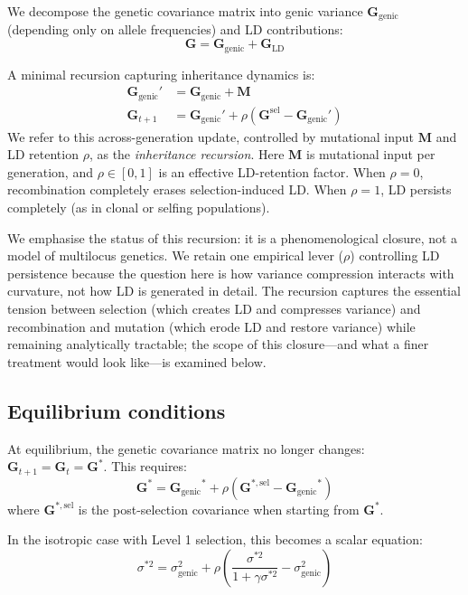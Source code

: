 \documentclass[9pt,twocolumn,twoside,lineno]{gsajnl}
\newcommand{\mat}[1]{\mathbf{#1}}
\newcommand{\Gsel}{\ensuremath{\mat{G}^{\text{sel}}}\xspace}
\newcommand{\Ggenic}{\ensuremath{\mat{G}_{\text{genic}}}\xspace}
\begin{document}
We decompose the genetic covariance matrix into genic variance $\Ggenic$ (depending only on allele frequencies) and LD contributions:
\begin{equation}
\mat{G} = \Ggenic + \mat{G}_{\text{LD}}
\end{equation}

A minimal recursion capturing inheritance dynamics is:
\begin{align}
\Ggenic' &= \Ggenic + \mat{M} \label{eq:bulmer-genic}\\
\mat{G}_{t+1} &= \Ggenic' + \rho(\Gsel - \Ggenic') \label{eq:bulmer-LD}
\end{align}
We refer to this across-generation update, controlled by mutational input $\mat{M}$ and LD retention $\rho$, as the \emph{inheritance recursion}. Here $\mat{M}$ is mutational input per generation, and $\rho \in [0, 1]$ is an effective LD-retention factor. When $\rho = 0$, recombination completely erases selection-induced LD. When $\rho = 1$, LD persists completely (as in clonal or selfing populations).

We emphasise the status of this recursion: it is a phenomenological closure, not a model of multilocus genetics. We retain one empirical lever ($\rho$) controlling LD persistence because the question here is how variance compression interacts with curvature, not how LD is generated in detail. The recursion captures the essential tension between selection (which creates LD and compresses variance) and recombination and mutation (which erode LD and restore variance) while remaining analytically tractable; the scope of this closure---and what a finer treatment would look like---is examined below.

\subsection{Equilibrium conditions}

At equilibrium, the genetic covariance matrix no longer changes: $\mat{G}_{t+1} = \mat{G}_t = \mat{G}^*$. This requires:
\begin{equation}
\mat{G}^* = \Ggenic^* + \rho(\mat{G}^{*,\text{sel}} - \Ggenic^*)
\label{eq:equilibrium}
\end{equation}
where $\mat{G}^{*,\text{sel}}$ is the post-selection covariance when starting from $\mat{G}^*$.

In the isotropic case with Level 1 selection, this becomes a scalar equation:
\begin{equation}
\sigma^{*2} = \sigma^2_{\text{genic}} + \rho\left(\frac{\sigma^{*2}}{1 + \gamma \sigma^{*2}} - \sigma^2_{\text{genic}}\right)
\end{equation}
\end{document}
